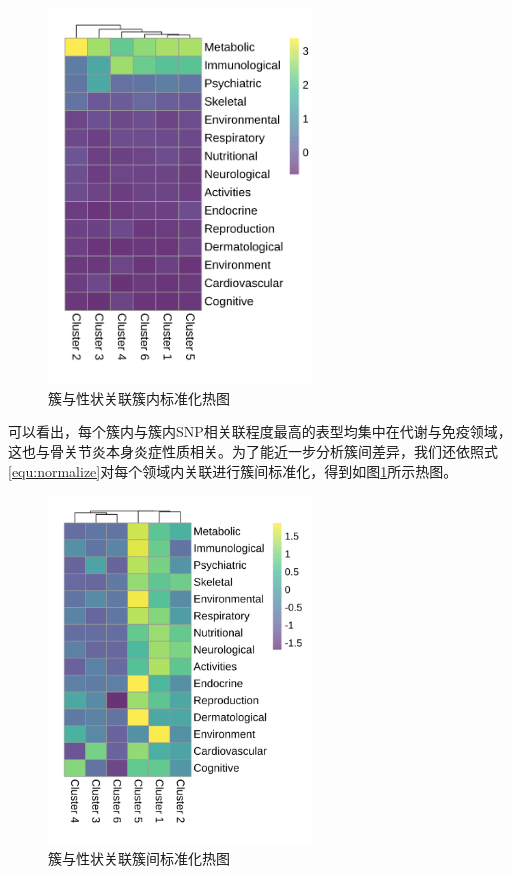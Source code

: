 \begin{figure}[htbp]
\centering
\includegraphics[width=7cm]{figures/Chapter4/VEM/Cluster/Heatmap_col.png}
\caption{簇与性状关联簇内标准化热图} \label{fig:heatmap_col}
\end{figure}

可以看出，每个簇内与簇内SNP相关联程度最高的表型均集中在代谢与免疫领域，这也与骨关节炎本身炎症性质相关。为了能近一步分析簇间差异，我们还依照式\ref{equ:normalize}对每个领域内关联进行簇间标准化，得到如图\ref{fig:heatmap_col}所示热图。

\begin{figure}[htbp]
\centering
\includegraphics[width=7cm]{figures/Chapter4/VEM/Cluster/Heatmap_row.png}
\caption{簇与性状关联簇间标准化热图} \label{fig:heatmap_row}
\end{figure}

